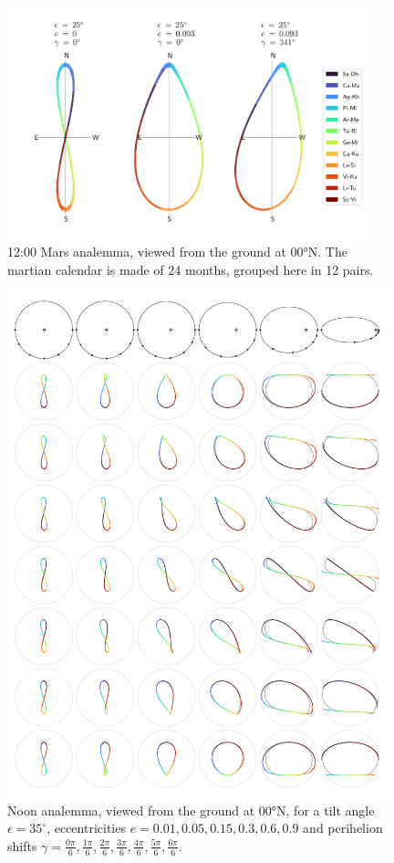 \documentclass[12pt]{article}
\begin{document}
\begin{figure}
    \centering
    \includegraphics[width=0.92\textwidth]{./comparisonMars.pdf}
    \caption{
        12:00 Mars analemma, viewed from the ground at 00°N. The martian 
        calendar is made of 24 months, grouped here in 12 pairs.
    }
    \label{fig:comparisonMars}
\end{figure}

\begin{figure}
    \centering
    \includegraphics[width=0.98\textwidth]{./mosaic.pdf}
    \caption{
        Noon analemma, viewed from the ground at 00°N, for a tilt angle $\epsilon=35^\circ$, 
        eccentricities $e=0.01, 0.05, 0.15, 0.3, 0.6, 0.9$ and perihelion shifts 
        $\gamma=\tfrac{0\pi}{6},\tfrac{1\pi}{6},\tfrac{2\pi}{6},\tfrac{3\pi}{6},
        \tfrac{4\pi}{6},\tfrac{5\pi}{6},\tfrac{6\pi}{6}$.
    }
    \label{fig:mosaic}
\end{figure}
\end{document}
